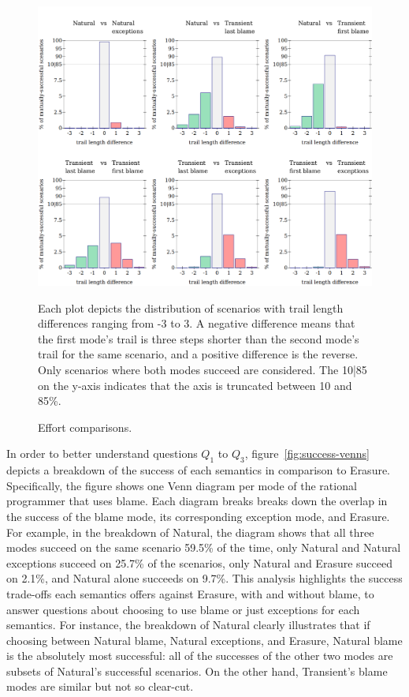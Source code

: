 \begin{figure}
  \centering
  \includegraphics[width=\textwidth]{./plots/bt-length-comparisons}

  \vspace{1em}
  \begin{minipage}{0.95\textwidth}
  Each plot depicts the distribution of scenarios with trail length differences ranging from -3 to 3.
  A negative difference means that the first mode's trail is three steps shorter than the second mode's trail for the same scenario, and a positive difference is the reverse.
  Only scenarios where both modes succeed are considered.
  The 10|85 on the y-axis indicates that the axis is truncated between 10 and 85\%.
  \end{minipage}

  \caption{Effort comparisons.}
  \label{fig:effort-comparisons}
\end{figure}

In order to better understand questions $Q_1$ to $Q_3$, figure~\ref{fig:success-venns} depicts a breakdown of the success of each semantics in comparison to Erasure.
Specifically, the figure shows one Venn diagram per mode of the rational programmer that uses blame.
Each diagram breaks breaks down the overlap in the success of the blame mode, its corresponding exception mode, and Erasure.
For example, in the breakdown of Natural, the diagram shows that all three modes succeed on the same scenario 59.5\% of the time, only Natural and Natural exceptions succeed on 25.7\% of the scenarios, only Natural and Erasure succeed on 2.1\%, and Natural alone succeeds on 9.7\%.
This analysis highlights the success trade-offs each semantics offers against Erasure, with and without blame, to answer questions about choosing to use blame or just exceptions for each semantics.
For instance, the breakdown of Natural clearly illustrates that if choosing between Natural blame, Natural exceptions, and Erasure, Natural blame is the absolutely most successful: all of the successes of the other two modes are subsets of Natural's successful scenarios.
On the other hand, Transient's blame modes are similar but not so clear-cut.


